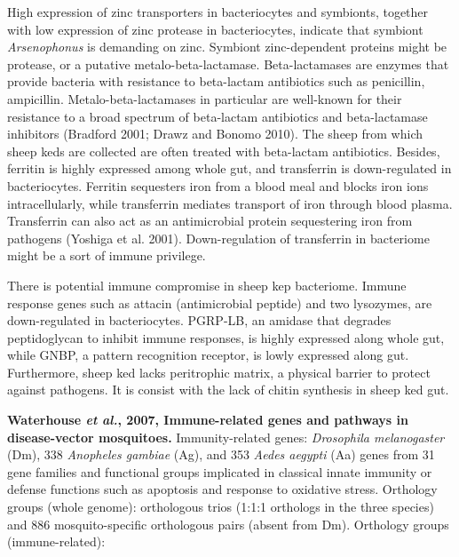 \documentclass[11pt]{article}
\begin{document}
\begin{sloppypar}
High expression of zinc transporters in bacteriocytes and symbionts, together with low expression of zinc protease in bacteriocytes, indicate that symbiont \textit{Arsenophonus} is demanding on zinc. 
Symbiont zinc-dependent proteins might be protease, or a putative metalo-beta-lactamase. 
Beta-lactamases are enzymes that provide bacteria with resistance to beta-lactam antibiotics such as penicillin, ampicillin. 
Metalo-beta-lactamases in particular are well-known for their resistance to a broad spectrum of beta-lactam antibiotics and beta-lactamase inhibitors (Bradford 2001; Drawz and Bonomo 2010). 
The sheep from which sheep keds are collected are often treated with beta-lactam antibiotics. 
Besides, ferritin is highly expressed among whole gut, and transferrin is down-regulated in bacteriocytes. 
Ferritin sequesters iron from a blood meal and blocks iron ions intracellularly, while transferrin mediates transport of iron through blood plasma. 
Transferrin can also act as an antimicrobial protein sequestering iron from pathogens (Yoshiga et al.
2001). 
Down-regulation of transferrin in bacteriome might be a sort of immune privilege.
\par
There is potential immune compromise in sheep kep bacteriome. 
Immune response genes such as attacin (antimicrobial peptide) and two lysozymes, are down-regulated in bacteriocytes. 
PGRP-LB, an amidase that degrades peptidoglycan to inhibit immune responses, is highly expressed along whole gut, while GNBP, a pattern recognition receptor, is lowly expressed along gut. 
Furthermore, sheep ked lacks peritrophic matrix, a physical barrier to protect against pathogens. 
It is consist with the lack of chitin synthesis in sheep ked gut.
\par
\textbf{Waterhouse \textit{et al.}, 2007, Immune-related genes and pathways in disease-vector mosquitoes.} \newline
Immunity-related genes: \textit{Drosophila melanogaster} (Dm), 338 \textit{Anopheles gambiae} (Ag), and 353 \textit{Aedes aegypti} (Aa) genes from 31 gene families and functional groups implicated in classical innate immunity or defense functions such as apoptosis and response to oxidative stress. \newline
Orthology groups (whole genome):  orthologous trios (1:1:1 orthologs in the three species) and 886 mosquito-specific orthologous pairs (absent from Dm). \newline
Orthology groups (immune-related):\newline

\end{sloppypar}
\end{document}
